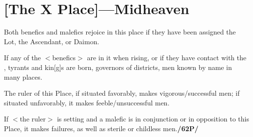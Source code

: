 \section{[The X Place]---Midheaven}

Both benefics and malefics rejoice in this place if they have been assigned the Lot, the Ascendant, or Daimon. 

If any of the $<$benefics$>$ are in it when rising, or if they have contact with the \Moon, tyrants and kin[g]s are born, governors of districts, men known by name in many places. 

The ruler of this Place, if situated favorably, makes vigorous/successful men; if situated unfavorably, it makes feeble/unsuccessful men. 

If $<$the ruler$>$ is setting and a malefic is in conjunction or in opposition to this Place, it makes failures, as well as sterile or childless men.\textbf{/62P/}

\newpage